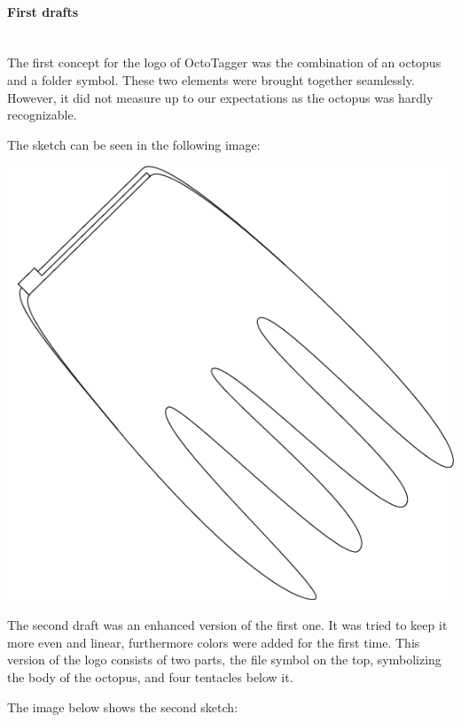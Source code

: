 \paragraph{First drafts} \hspace{0pt} \\

The first concept for the logo of OctoTagger was the combination of an octopus and a folder symbol. These two elements were brought together seamlessly. However, it did not measure up to our expectations as the octopus was hardly recognizable. 

The sketch can be seen in the following image:

\begin{center}
\includegraphics[scale=0.30]{images/logo_v01.png}
\end{center}

The second draft was an enhanced version of the first one. It was tried to keep it more even and linear, furthermore colors were added for the first time. This version of the logo consists of two parts, the file symbol on the top, symbolizing the body of the octopus, and four tentacles below it.

The image below shows the second sketch:


